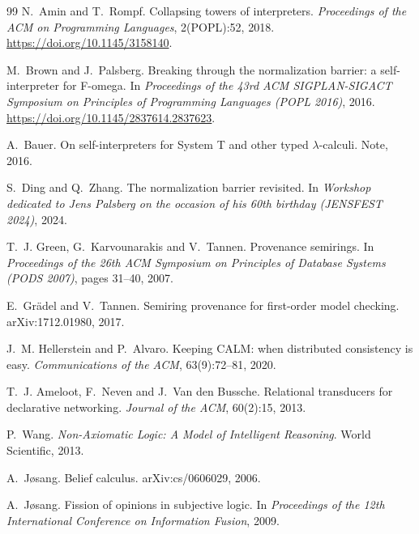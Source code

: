 \documentclass[11pt]{article}
\theoremstyle{definition}
\theoremstyle{remark}
\begin{document}
\begin{thebibliography}{99}
N.~Amin and T.~Rompf.
\newblock Collapsing towers of interpreters.
\newblock \emph{Proceedings of the ACM on Programming Languages}, 2(POPL):52,
  2018.
\newblock \url{https://doi.org/10.1145/3158140}.

M.~Brown and J.~Palsberg.
\newblock Breaking through the normalization barrier: a self-interpreter for
  {F}-omega.
\newblock In \emph{Proceedings of the 43rd ACM SIGPLAN-SIGACT Symposium on
  Principles of Programming Languages (POPL 2016)}, 2016.
\newblock \url{https://doi.org/10.1145/2837614.2837623}.

A.~Bauer.
\newblock On self-interpreters for {S}ystem {T} and other typed
  $\lambda$-calculi.
\newblock Note, 2016.

S.~Ding and Q.~Zhang.
\newblock The normalization barrier revisited.
\newblock In \emph{Workshop dedicated to Jens Palsberg on the occasion of his
  60th birthday (JENSFEST 2024)}, 2024.

T.~J. Green, G.~Karvounarakis and V.~Tannen.
\newblock Provenance semirings.
\newblock In \emph{Proceedings of the 26th ACM Symposium on Principles of
  Database Systems (PODS 2007)}, pages 31--40, 2007.

E.~Gr\"adel and V.~Tannen.
\newblock Semiring provenance for first-order model checking.
\newblock arXiv:1712.01980, 2017.

J.~M. Hellerstein and P.~Alvaro.
\newblock Keeping {CALM}: when distributed consistency is easy.
\newblock \emph{Communications of the ACM}, 63(9):72--81, 2020.

T.~J. Ameloot, F.~Neven and J.~Van den Bussche.
\newblock Relational transducers for declarative networking.
\newblock \emph{Journal of the ACM}, 60(2):15, 2013.

P.~Wang.
\newblock \emph{Non-Axiomatic Logic: A Model of Intelligent Reasoning}.
\newblock World Scientific, 2013.

A.~J{\o}sang.
\newblock Belief calculus.
\newblock arXiv:cs/0606029, 2006.

A.~J{\o}sang.
\newblock Fission of opinions in subjective logic.
\newblock In \emph{Proceedings of the 12th International Conference on
  Information Fusion}, 2009.


\end{thebibliography}
\end{document}
